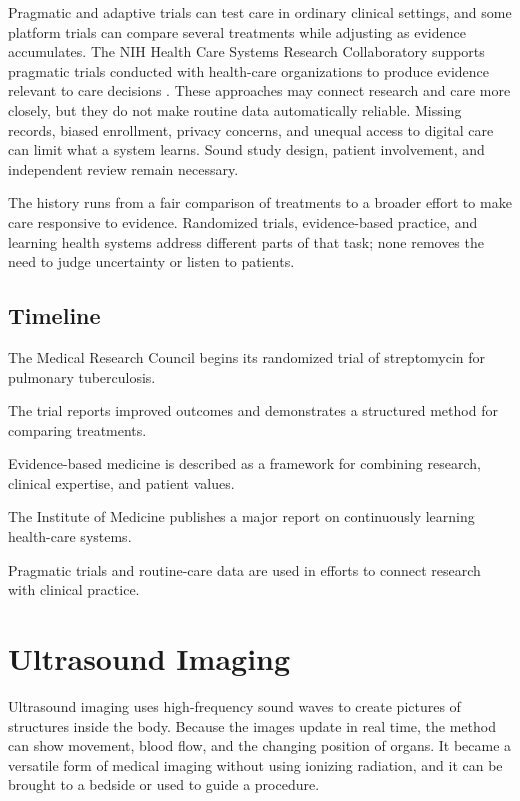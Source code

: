 \documentclass[12pt,oneside]{book}
\begin{document}
Pragmatic and adaptive trials can test care in ordinary clinical settings, and
some platform trials can compare several treatments while adjusting as evidence
accumulates. The NIH Health Care Systems Research Collaboratory supports
pragmatic trials conducted with health-care organizations to produce evidence
relevant to care decisions \cite{nihPragmaticTrials}. These approaches may
connect research and care more closely, but they do not make routine data
automatically reliable. Missing records, biased enrollment, privacy concerns,
and unequal access to digital care can limit what a system learns. Sound study
design, patient involvement, and independent review remain necessary.

The history runs from a fair comparison of treatments to a broader effort to
make care responsive to evidence. Randomized trials, evidence-based practice,
and learning health systems address different parts of that task; none removes
the need to judge uncertainty or listen to patients.

\section*{Timeline}
\begin{description}[leftmargin=2.3cm,style=nextline]
  \item[1946] The Medical Research Council begins its randomized trial of streptomycin for pulmonary tuberculosis.
  \item[1948] The trial reports improved outcomes and demonstrates a structured method for comparing treatments.
  \item[1992--1996] Evidence-based medicine is described as a framework for combining research, clinical expertise, and patient values.
  \item[2013] The Institute of Medicine publishes a major report on continuously learning health-care systems.
  \item[Today] Pragmatic trials and routine-care data are used in efforts to connect research with clinical practice.
\end{description}
\chapter[Ultrasound Imaging]{Ultrasound Imaging}

Ultrasound imaging uses high-frequency sound waves to create pictures of
structures inside the body. Because the images update in real time, the
method can show movement, blood flow, and the changing position of organs.
It became a versatile form of medical imaging without using ionizing
radiation, and it can be brought to a bedside or used to guide a procedure.
\end{document}
